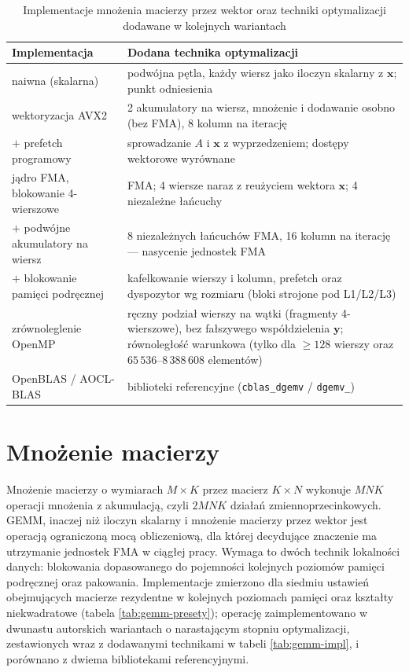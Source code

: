 \documentclass[a4paper,12pt]{book} %
\begin{document}
\begin{table}[t!]
\centering
\caption{Implementacje mnożenia macierzy przez wektor oraz techniki optymalizacji dodawane w kolejnych wariantach}
\label{tab:gemv-impl}
\begin{tabular}{p{} p{}}
\hline
Implementacja & Dodana technika optymalizacji \\
\hline
naiwna (skalarna) & podwójna pętla, każdy wiersz jako iloczyn skalarny z $\mathbf{x}$; punkt odniesienia \\
wektoryzacja AVX2 & 2 akumulatory na wiersz, mnożenie i dodawanie osobno (bez FMA), 8 kolumn na iterację \\
$+$ prefetch programowy & sprowadzanie $A$ i $\mathbf{x}$ z wyprzedzeniem; dostępy wektorowe wyrównane \\
jądro FMA, blokowanie 4-wierszowe & FMA; 4 wiersze naraz z reużyciem wektora $\mathbf{x}$; 4 niezależne łańcuchy \\
$+$ podwójne akumulatory na wiersz & 8 niezależnych łańcuchów FMA, 16 kolumn na iterację --- nasycenie jednostek FMA \\
$+$ blokowanie pamięci podręcznej & kafelkowanie wierszy i kolumn, prefetch oraz dyspozytor wg rozmiaru (bloki strojone pod L1/L2/L3) \\
zrównoleglenie OpenMP & ręczny podział wierszy na wątki (fragmenty 4-wierszowe), bez fałszywego współdzielenia $\mathbf{y}$; równoległość warunkowa (tylko dla $\ge 128$ wierszy oraz $65\,536$--$8\,388\,608$ elementów) \\
OpenBLAS / AOCL-BLAS & biblioteki referencyjne (\texttt{cblas\_dgemv} / \texttt{dgemv\_}) \\
\hline
\end{tabular}
\end{table}

\section{Mnożenie macierzy}
\label{sec:impl-gemm}

Mnożenie macierzy o wymiarach $M \times K$ przez macierz $K \times N$ wykonuje $M N K$ operacji mnożenia z akumulacją, czyli $2 M N K$ działań zmiennoprzecinkowych. GEMM, inaczej niż iloczyn skalarny i mnożenie macierzy przez wektor jest operacją ograniczoną mocą obliczeniową, dla której decydujące znaczenie ma utrzymanie jednostek FMA w ciągłej pracy. Wymaga to dwóch technik lokalności danych: blokowania dopasowanego do pojemności kolejnych poziomów pamięci podręcznej oraz pakowania. Implementacje zmierzono dla siedmiu ustawień obejmujących macierze rezydentne w kolejnych poziomach pamięci oraz kształty niekwadratowe (tabela \ref{tab:gemm-presety}); operację zaimplementowano w dwunastu autorskich wariantach o narastającym stopniu optymalizacji, zestawionych wraz z dodawanymi technikami w tabeli \ref{tab:gemm-impl}, i porównano z dwiema bibliotekami referencyjnymi.
\end{document}
